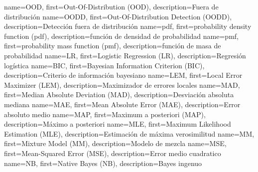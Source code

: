   {name={OOD},        first={Out-Of-Distribution (OOD)},                  description={Fuera de distribución}}
 {name={OODD},       first={Out-Of-Distribution Detection (OODD)},       description={Detección fuera de distribución}}
  {name={pdf},        first={probability density function (pdf)},         description={función de densidad de probabilidad}}
  {name={pmf},        first={probability mass function (pmf)},            description={función de masa de probabilidad}}
   {name={LR},         first={Logistic Regression (LR)},                   description={Regresión logística}}
  {name={BIC},        first={Bayesian Information Criterion (BIC)},       description={Criterio de información bayesiano}}
  {name={LEM},        first={Local Error Maximizer (LEM)},                description={Maximizador de errores locales}}
  {name={MAD},        first={Median Absolute Deviation (MAD)},            description={Desviación absoluta mediana}}
  {name={MAE},        first={Mean Absolute Error (MAE)},                  description={Error absoluto medio}}
  {name={MAP},        first={Maximum a posteriori (MAP)},                 description={Máximo a posteriori}}
  {name={MLE},        first={Maximum Likelihood Estimation (MLE)},        description={Estimación de máxima verosimilitud}}
   {name={MM},         first={Mixture Model (MM)},                         description={Modelo de mezcla}}
  {name={MSE},        first={Mean-Squared Error (MSE)},                   description={Error medio cuadratico}}
   {name={NB},         first={Native Bayes (NB)},                          description={Bayes ingenuo}}


